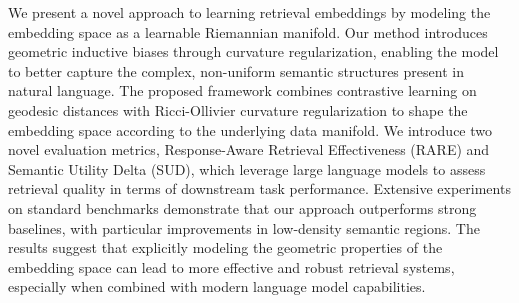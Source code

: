 We present a novel approach to learning retrieval embeddings by modeling the embedding space as a learnable Riemannian manifold. Our method introduces geometric inductive biases through curvature regularization, enabling the model to better capture the complex, non-uniform semantic structures present in natural language. The proposed framework combines contrastive learning on geodesic distances with Ricci-Ollivier curvature regularization to shape the embedding space according to the underlying data manifold. We introduce two novel evaluation metrics, Response-Aware Retrieval Effectiveness (RARE) and Semantic Utility Delta (SUD), which leverage large language models to assess retrieval quality in terms of downstream task performance. Extensive experiments on standard benchmarks demonstrate that our approach outperforms strong baselines, with particular improvements in low-density semantic regions. The results suggest that explicitly modeling the geometric properties of the embedding space can lead to more effective and robust retrieval systems, especially when combined with modern language model capabilities.
